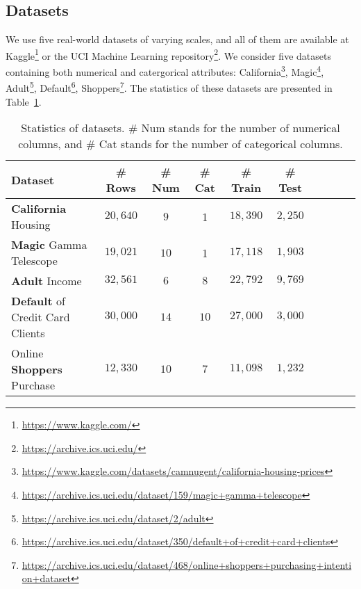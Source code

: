 \subsection{Datasets} \label{appendix:datasets}
We use five real-world datasets of varying scales, and all of them are available at Kaggle\footnote{\url{https://www.kaggle.com/}} or the UCI Machine Learning repository\footnote{\url{https://archive.ics.uci.edu/}}. We consider five datasets containing both numerical and catergorical attributes: California\footnote{\url{https://www.kaggle.com/datasets/camnugent/california-housing-prices}}, Magic\footnote{\url{https://archive.ics.uci.edu/dataset/159/magic+gamma+telescope}}, Adult\footnote{\url{https://archive.ics.uci.edu/dataset/2/adult}}, Default\footnote{\url{https://archive.ics.uci.edu/dataset/350/default+of+credit+card+clients}}, Shoppers\footnote{\url{https://archive.ics.uci.edu/dataset/468/online+shoppers+purchasing+intention+dataset}}. The statistics of these datasets are presented in Table~\ref{tbl:stat-dataset}. 
\begin{table}[h] 
    \centering
    \caption{Statistics of datasets. \# Num stands for the number of numerical columns, and \# Cat stands for the number of categorical columns.} 
    \label{tbl:stat-dataset}
    \small
    \begin{threeparttable}
    {
    \scalebox{0.95}
    {
	\begin{tabular}{lccccccccc}
            \toprule[0.8pt]
            \textbf{Dataset}  &  \# Rows  & \# Num & \# Cat & \# Train  & \# Test  \\
            \midrule 
            \textbf{California} Housing  & $20,640$ & $9$ & 1 & $18,390$ & $2,250$   \\
            \textbf{Magic} Gamma Telescope & $19,021$ & $10$ & 1 & $17,118$ & $1,903$  \\
            \textbf{Adult} Income & $32,561$ & $6$ & $8$ & $22,792$ & $9,769$ \\
            \textbf{Default} of Credit Card Clients & $30,000$ & $14$ & $10$ & $27,000$ & $3,000$\\
            Online \textbf{Shoppers} Purchase & $12,330$ & $10$ & $7$ & $11,098$ & $1,232$ \\
		\bottomrule[1.0pt] 
		\end{tabular}
   }
  }        
  \end{threeparttable}
\end{table}

